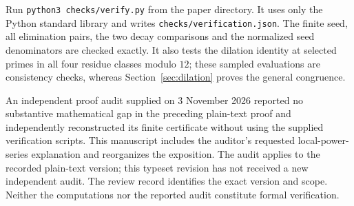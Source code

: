 Run \texttt{python3 checks/verify.py} from the paper directory. It uses
only the Python standard library and writes \texttt{checks/verification.json}.
The finite seed, all elimination pairs, the two decay comparisons and
the normalized seed denominators are checked exactly. It also tests
the dilation identity at selected primes in all four residue classes
modulo $12$; these sampled evaluations are consistency checks, whereas
Section~\ref{sec:dilation} proves the general congruence.

An independent proof audit supplied on 3 November 2026 reported no
substantive mathematical gap in the preceding plain-text proof and
independently reconstructed its finite certificate without using the
supplied verification scripts. This manuscript includes the auditor's
requested local-power-series explanation and reorganizes the exposition.
The audit applies to the recorded plain-text version; this typeset
revision has not received a new independent audit. The review record
identifies the exact version and scope. Neither the computations nor
the reported audit constitute formal verification.

